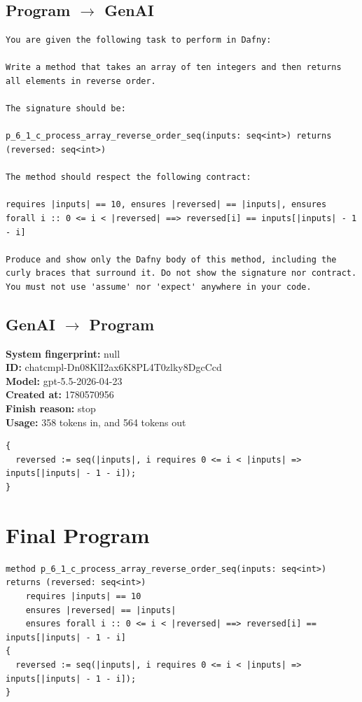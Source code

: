 \documentclass{article}
\begin{document}
\subsection*{Program $\rightarrow$ GenAI}
\begin{lstlisting}
You are given the following task to perform in Dafny:

Write a method that takes an array of ten integers and then returns all elements in reverse order.

The signature should be:

p_6_1_c_process_array_reverse_order_seq(inputs: seq<int>) returns (reversed: seq<int>)

The method should respect the following contract:

requires |inputs| == 10, ensures |reversed| == |inputs|, ensures forall i :: 0 <= i < |reversed| ==> reversed[i] == inputs[|inputs| - 1 - i]

Produce and show only the Dafny body of this method, including the curly braces that surround it. Do not show the signature nor contract. You must not use 'assume' nor 'expect' anywhere in your code.
\end{lstlisting}
\subsection*{GenAI $\rightarrow$ Program}
\textbf{System fingerprint: }null
\\\textbf{ID: }chatcmpl-Dn08KlI2ax6K8PL4T0zlky8DgcCcd
\\\textbf{Model: }gpt-5.5-2026-04-23
\\\textbf{Created at: }1780570956
\\\textbf{Finish reason: }stop
\\\textbf{Usage: }358 tokens in, and 564 tokens out
\begin{lstlisting}
{
  reversed := seq(|inputs|, i requires 0 <= i < |inputs| => inputs[|inputs| - 1 - i]);
}
\end{lstlisting}
\section*{Final Program}
\begin{lstlisting}
method p_6_1_c_process_array_reverse_order_seq(inputs: seq<int>) returns (reversed: seq<int>)
	requires |inputs| == 10
	ensures |reversed| == |inputs|
	ensures forall i :: 0 <= i < |reversed| ==> reversed[i] == inputs[|inputs| - 1 - i]
{
  reversed := seq(|inputs|, i requires 0 <= i < |inputs| => inputs[|inputs| - 1 - i]);
}
\end{lstlisting}
\end{document}
